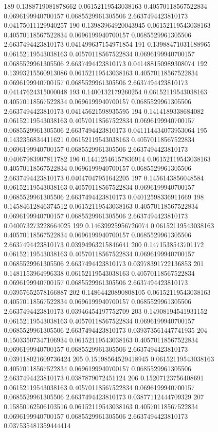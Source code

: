 {189 0.1388719081878662 0.06152119543038163 0.40570118567522834 0.0696199940700157 0.0685529961305506 2.6637494423810173 0.04175011129940257
190 0.13983964920043945 0.06152119543038163 0.40570118567522834 0.0696199940700157 0.0685529961305506 2.6637494423810173 0.041499637154971854
191 0.13988471031188965 0.06152119543038163 0.40570118567522834 0.0696199940700157 0.0685529961305506 2.6637494423810173 0.041488150989308074
192 0.13993215560913086 0.06152119543038163 0.40570118567522834 0.0696199940700157 0.0685529961305506 2.6637494423810173 0.04147624315000048
193 0.1400132179260254 0.06152119543038163 0.40570118567522834 0.0696199940700157 0.0685529961305506 2.6637494423810173 0.04145621598935595
194 0.1414189338684082 0.06152119543038163 0.40570118567522834 0.0696199940700157 0.0685529961305506 2.6637494423810173 0.041114434073953064
195 0.1432356834411621 0.06152119543038163 0.40570118567522834 0.0696199940700157 0.0685529961305506 2.6637494423810173 0.04067983907811782
196 0.14412546157836914 0.06152119543038163 0.40570118567522834 0.0696199940700157 0.0685529961305506 2.6637494423810173 0.04047047951642205
197 0.1456143856048584 0.06152119543038163 0.40570118567522834 0.0696199940700157 0.0685529961305506 2.6637494423810173 0.04012598336911669
198 0.14584612846374512 0.06152119543038163 0.40570118567522834 0.0696199940700157 0.0685529961305506 2.6637494423810173 0.040073273228664025
199 0.14639925956726074 0.06152119543038163 0.40570118567522834 0.0696199940700157 0.0685529961305506 2.6637494423810173 0.03994963215846641
200 0.1471538543701172 0.06152119543038163 0.40570118567522834 0.0696199940700157 0.0685529961305506 2.6637494423810173 0.03978391722136853
201 0.1481153964996338 0.06152119543038163 0.40570118567522834 0.0696199940700157 0.0685529961305506 2.6637494423810173 0.03957652578166887
202 0.14864420890808105 0.06152119543038163 0.40570118567522834 0.0696199940700157 0.0685529961305506 2.6637494423810173 0.03946454197752709
203 0.14908194541931152 0.06152119543038163 0.40570118567522834 0.0696199940700157 0.0685529961305506 2.6637494423810173 0.039373561447741935
204 0.15033507347106934 0.06152119543038163 0.40570118567522834 0.0696199940700157 0.0685529961305506 2.6637494423810173 0.039118021609736424
205 0.15198564529418945 0.06152119543038163 0.40570118567522834 0.0696199940700157 0.0685529961305506 2.6637494423810173 0.0387879072451124
206 0.15207123756408691 0.06152119543038163 0.40570118567522834 0.0696199940700157 0.0685529961305506 2.6637494423810173 0.03877112444709329
207 0.15850162506103516 0.06152119543038163 0.40570118567522834 0.0696199940700157 0.0685529961305506 2.6637494423810173 0.037535481359444414
}
